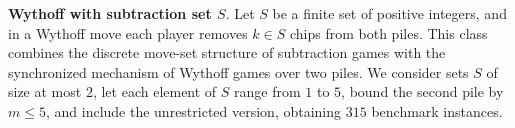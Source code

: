 \documentclass[review]{elsarticle}
\newcommand{\set}[1]{\{ #1 \}}
\newcommand{\tuple}[1]{\langle {#1} \rangle}
\newcommand{\true}{\top}
\newcommand{\statevar}{\mathcal{X}}
\newcommand{\act}{\mathcal{A}}
\newcommand{\constraint}{\mathcal{C}}
\newcommand{\estate}{\mathcal{E}}
\newcommand{\pre}{\mathtt{pre}}
\newcommand{\eff}{\mathtt{eff}}
\begin{document}
\textbf{Wythoff with subtraction set $S$}. Let $S$ be a finite set of positive integers, and in a Wythoff move each player removes $k \in S$ chips from both piles.
This class combines the discrete move-set structure of subtraction games with the synchronized mechanism of Wythoff games over two piles.
We consider sets $S$ of size at most $2$, let each element of $S$ range from $1$ to $5$, bound the second pile by $m \le 5$, and include the unrestricted version, obtaining $315$ benchmark instances.
\end{document}
